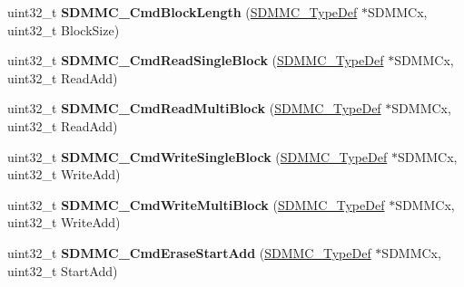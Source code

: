 \begin{DoxyCompactItemize}
\item 
\mbox{\label{group___h_a_l___s_d_m_m_c___l_l___group3_ga38b24b2920629600469b21ffe45e352c}} 
uint32\+\_\+t {\bfseries S\+D\+M\+M\+C\+\_\+\+Cmd\+Block\+Length} (\mbox{\hyperlink{struct_s_d_m_m_c___type_def}{S\+D\+M\+M\+C\+\_\+\+Type\+Def}} $\ast$S\+D\+M\+M\+Cx, uint32\+\_\+t Block\+Size)
\item 
\mbox{\label{group___h_a_l___s_d_m_m_c___l_l___group3_ga0c593df72abc107ea831f851ac7247cf}} 
uint32\+\_\+t {\bfseries S\+D\+M\+M\+C\+\_\+\+Cmd\+Read\+Single\+Block} (\mbox{\hyperlink{struct_s_d_m_m_c___type_def}{S\+D\+M\+M\+C\+\_\+\+Type\+Def}} $\ast$S\+D\+M\+M\+Cx, uint32\+\_\+t Read\+Add)
\item 
\mbox{\label{group___h_a_l___s_d_m_m_c___l_l___group3_ga592178f071f045309198f913d454f57c}} 
uint32\+\_\+t {\bfseries S\+D\+M\+M\+C\+\_\+\+Cmd\+Read\+Multi\+Block} (\mbox{\hyperlink{struct_s_d_m_m_c___type_def}{S\+D\+M\+M\+C\+\_\+\+Type\+Def}} $\ast$S\+D\+M\+M\+Cx, uint32\+\_\+t Read\+Add)
\item 
\mbox{\label{group___h_a_l___s_d_m_m_c___l_l___group3_ga94c7f63b0d3f2219a2040b987f3d9345}} 
uint32\+\_\+t {\bfseries S\+D\+M\+M\+C\+\_\+\+Cmd\+Write\+Single\+Block} (\mbox{\hyperlink{struct_s_d_m_m_c___type_def}{S\+D\+M\+M\+C\+\_\+\+Type\+Def}} $\ast$S\+D\+M\+M\+Cx, uint32\+\_\+t Write\+Add)
\item 
\mbox{\label{group___h_a_l___s_d_m_m_c___l_l___group3_ga6dad29e69cb547c8357eef89f3036ba1}} 
uint32\+\_\+t {\bfseries S\+D\+M\+M\+C\+\_\+\+Cmd\+Write\+Multi\+Block} (\mbox{\hyperlink{struct_s_d_m_m_c___type_def}{S\+D\+M\+M\+C\+\_\+\+Type\+Def}} $\ast$S\+D\+M\+M\+Cx, uint32\+\_\+t Write\+Add)
\item 
\mbox{\label{group___h_a_l___s_d_m_m_c___l_l___group3_ga082d0e845632a5ac0eae8946ed5309c3}} 
uint32\+\_\+t {\bfseries S\+D\+M\+M\+C\+\_\+\+Cmd\+Erase\+Start\+Add} (\mbox{\hyperlink{struct_s_d_m_m_c___type_def}{S\+D\+M\+M\+C\+\_\+\+Type\+Def}} $\ast$S\+D\+M\+M\+Cx, uint32\+\_\+t Start\+Add)
\item 

\end{DoxyCompactItemize}
